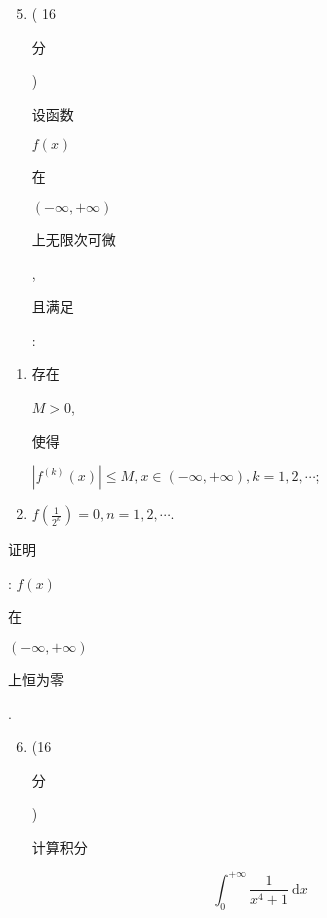 \documentclass[10pt]{article}
\begin{document}
\begin{enumerate}
  \setcounter{enumi}{4}
  \item ( 16 \begin{CJK}{UTF8}{mj}分\end{CJK}) \begin{CJK}{UTF8}{mj}设函数\end{CJK} $f(x)$ \begin{CJK}{UTF8}{mj}在\end{CJK} $(-\infty,+\infty)$ \begin{CJK}{UTF8}{mj}上无限次可微\end{CJK}, \begin{CJK}{UTF8}{mj}且满足\end{CJK}:
\end{enumerate}
\begin{enumerate}
  \item \begin{CJK}{UTF8}{mj}存在\end{CJK} $M>0$, \begin{CJK}{UTF8}{mj}使得\end{CJK} $\left|f^{(k)}(x)\right| \leqslant M, x \in(-\infty,+\infty), k=1,2, \cdots$;

  \item $f\left(\frac{1}{2^{k}}\right)=0, n=1,2, \cdots .$

\end{enumerate}
\begin{CJK}{UTF8}{mj}证明\end{CJK}: $f(x)$ \begin{CJK}{UTF8}{mj}在\end{CJK} $(-\infty,+\infty)$ \begin{CJK}{UTF8}{mj}上恒为零\end{CJK}.

\begin{enumerate}
  \setcounter{enumi}{5}
  \item (16 \begin{CJK}{UTF8}{mj}分\end{CJK}) \begin{CJK}{UTF8}{mj}计算积分\end{CJK}
\end{enumerate}
$$
\int_{0}^{+\infty} \frac{1}{x^{4}+1} \mathrm{~d} x
$$
\end{document}
